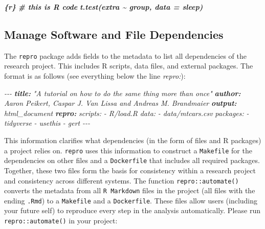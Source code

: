 \documentclass[psych,tutorial,accept,moreauthors,pdftex]{Definitions/mdpi}
\newenvironment{Shaded}{\begin{snugshade}}{\end{snugshade}}
\newcommand{\AnnotationTok}[1]{\textcolor[rgb]{0.56,0.35,0.01}{\textbf{\textit{#1}}}}
\newcommand{\CommentTok}[1]{\textcolor[rgb]{0.56,0.35,0.01}{\textit{#1}}}
\newcommand{\InformationTok}[1]{\textcolor[rgb]{0.56,0.35,0.01}{\textbf{\textit{#1}}}}
\begin{document}
\begin{paracol}{2}
\begin{adjustwidth}{0.5cm}{0cm}
\begin{Shaded}
\begin{Highlighting}[]
\InformationTok{\textasciigrave{}\textasciigrave{}\textasciigrave{}\{r\}}
\InformationTok{\# this is R code}
\InformationTok{t.test(extra \textasciitilde{} group, data = sleep)}
\InformationTok{\textasciigrave{}\textasciigrave{}\textasciigrave{}}
\end{Highlighting}
\end{Shaded}
\end{adjustwidth}

\subsection{Manage Software and File
Dependencies}\label{manage-software-and-file-dependencies}

The \texttt{repro} package adds fields to the metadata to list all
dependencies of the research project. This includes R scripts, data
files, and external packages. The format is as follows (see everything
below the line \emph{repro:}):

\begin{adjustwidth}{0.5cm}{0cm} 
\begin{Shaded}
\begin{Highlighting}[]
\CommentTok{{-}{-}{-}}
\AnnotationTok{title:}\CommentTok{ "A tutorial on how to do the same thing more than once"}
\AnnotationTok{author:}\CommentTok{ Aaron Peikert, Caspar J. Van Lissa and Andreas M. Brandmaier}
\AnnotationTok{output:}\CommentTok{ html\_document}
\AnnotationTok{repro:}
\CommentTok{  scripts:}
\CommentTok{    {-} R/load.R}
\CommentTok{  data:}
\CommentTok{    {-} data/mtcars.csv}
\CommentTok{  packages:}
\CommentTok{    {-} tidyverse}
\CommentTok{    {-} usethis}
\CommentTok{    {-} gert}
\CommentTok{{-}{-}{-}}
\end{Highlighting}
\end{Shaded}
\end{adjustwidth}

This information clarifies what dependencies (in the form of files and R
packages) a project relies on. \texttt{repro} uses this information to
construct a \texttt{Makefile} for the dependencies on other files and a
\texttt{Dockerfile} that includes all required packages. Together, these
two files form the basis for consistency within a research project and
consistency across different systems. The function
\texttt{repro::automate()} converts the metadata from all
\texttt{R\ Markdown} files in the project (all files with the ending
\texttt{.Rmd}) to a \texttt{Makefile} and a \texttt{Dockerfile}. These
files allow users (including your future self) to reproduce every step
in the analysis automatically. Please run \texttt{repro::automate()} in
your project:


\end{paracol}
\end{document}
